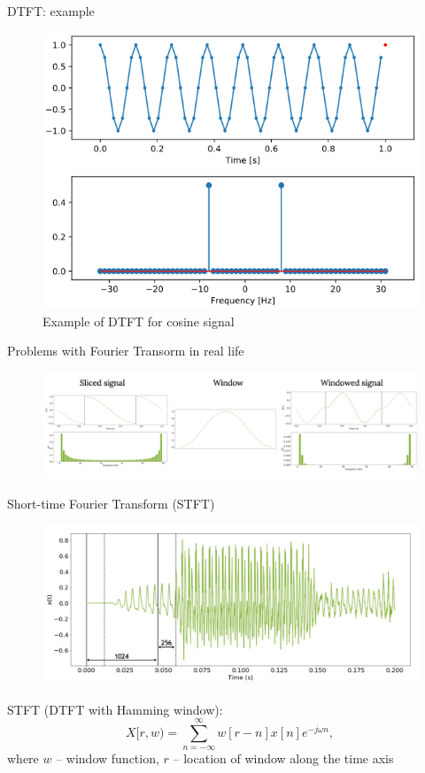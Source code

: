 \begin{frame}{DTFT: example}
\begin{figure}
	\centering
	\includegraphics[width=0.8\linewidth]{figs/signal_spectrum.png}
	\caption{Example of DTFT for cosine signal}
\end{figure}
\end{frame}
\begin{frame}{Problems with Fourier Transorm in real life}
	\begin{figure}
		\centering
		\includegraphics[width=0.99\linewidth]{figs/fourier_problems.png}
	\end{figure}
\end{frame}

\begin{frame}{Short-time Fourier Transform (STFT)}
\begin{figure}
	\centering
	\includegraphics[width=0.99\linewidth]{figs/stft.png}
\end{figure}
STFT (DTFT with Hamming window): $$X[r, w)=\sum_{n=-\infty}^{\infty} w[r-n] x[n] e^{-j \omega n},$$ where $w$ -- window function, $r$ -- location of window along the time axis
\end{frame}
